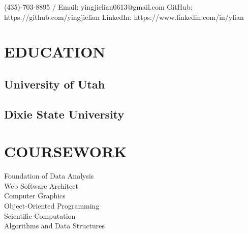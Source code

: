 \documentclass[]{deedy-resume-openfont}
\begin{document}
%
%
\lastupdated

%
%


       {(435)-703-8895 / Email: yingjielian0613@gmail.com}
       {GitHub: https://github.com/yingjielian}
       {LinkedIn: https://www.linkedin.com/in/ylian}



%
%

\begin{minipage}[t]{0.34\textwidth} 


\section{EDUCATION} 

\subsection{University of Utah }
\sectionsep

\subsection{Dixie State University}
\sectionsep
\sectionsep

\section{COURSEWORK}
Foundation of Data Analysis \\
Web Software Architect \\
Computer Graphics \\
Object-Oriented Programming \\
Scientific Computation  \\
Algorithms and Data Structures\\
\sectionsep
\sectionsep


\end{minipage}
\end{document}
